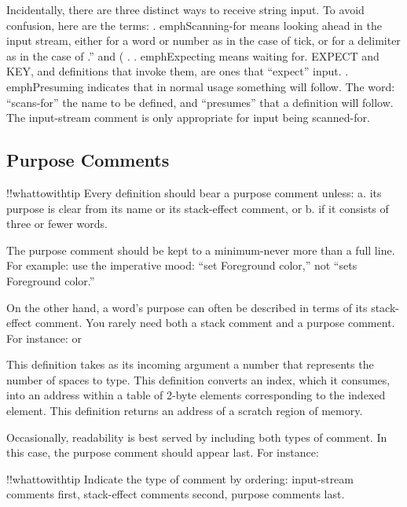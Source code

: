 Incidentally, there are three distinct ways to receive string input.  To
avoid confusion, here are the terms:
. emph{Scanning-for} means looking ahead in the input stream, either for a word or
number as in the case of tick, or for a delimiter as in the case of .'' and ( .
. emph{Expecting} means waiting for.  EXPECT and KEY, and definitions that invoke
them, are ones that ``expect'' input.
. emph{Presuming} indicates that in normal usage something will follow.  The word:
``scans-for'' the name to be defined, and ``presumes'' that a definition will
follow.
The input-stream comment is only appropriate for input being scanned-for.

\subsection{Purpose Comments}

!!whattowithtip{
Every definition should bear a purpose comment unless:
a. its purpose is clear from its name or its stack-effect comment, or
b. if it consists of three or fewer words.
}

The purpose comment should be kept to a minimum-never more than a
full line.  For example:
use the imperative mood: ``set Foreground color,'' not ``sets Foreground
color.''

On the other hand, a word's purpose can often be described in terms
of its stack-effect comment.  You rarely need both a stack comment and a
purpose comment.  For instance:
or

This definition takes as its incoming argument a number that represents
the number of spaces to type.
This definition converts an index, which it consumes, into an address
within a table of 2-byte elements corresponding to the indexed element.
This definition returns an address of a scratch region of memory.

Occasionally, readability is best served by including both types of
comment.  In this case, the purpose comment should appear last.  For
instance:

!!whattowithtip{
Indicate the type of comment by ordering: input-stream comments first,
stack-effect comments second, purpose comments last.
}

